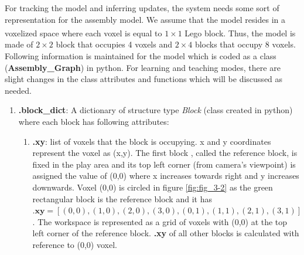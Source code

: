 For tracking the model and inferring updates, the system needs some sort of representation for the assembly model. We assume that the model resides in a voxelized space \parencite{gupta2012duplotrack} where each voxel is equal to $1 \times 1$ Lego\textsuperscript\textregistered{} block. Thus, the model is made of $2 \times 2$ block  that occupies 4 voxels and $2 \times 4$  blocks that occupy 8 voxels. Following information is maintained for the model which is coded as a class (\textbf{Assembly\_Graph}) in python. For learning and teaching modes, there are slight changes in the class attributes and functions which will be discussed as needed. 
\begin{enumerate}
    \item \textbf{.block\_dict}: A dictionary of structure type \emph{Block} (class created in python) where each block has following attributes:
    \begin{enumerate}
        \item \textbf{.xy}: list of voxels that the block is occupying. x and y coordinates represent the voxel as (x,y). The first block , called the reference block, is fixed in the play area and its top left corner (from camera's viewpoint) is assigned the value of (0,0) where x increases towards right and y increases downwards. Voxel (0,0) is circled in figure \ref{fig:fig_3-2} as the green rectangular block is the reference block and it has \\
        $\textbf{.xy} = [(0,0), (1,0), (2,0), (3,0), (0,1), (1,1), (2,1), (3,1)]$.  The workspace is represented as a grid of voxels with (0,0) at the top left corner of the reference block. \textbf{.xy} of all other blocks is calculated with reference to (0,0) voxel. 

\end{enumerate}
\end{enumerate}
